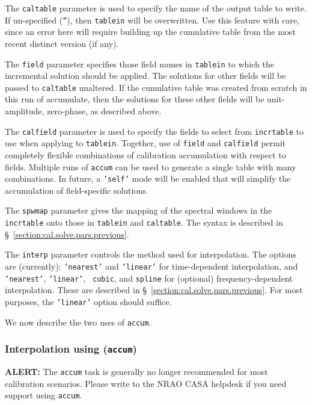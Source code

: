 The {\tt caltable} parameter is used to specify the name of the output
table to write. If un-specified ({\tt ''}), then {\tt tablein} will be
overwritten. Use this feature with care, since an error here will
require building up the cumulative table from the most recent distinct
version (if any).

The {\tt field} parameter specifies those field names in {\tt tablein} to
which the incremental solution should be applied. The solutions for
other fields will be passed to {\tt caltable} unaltered. If the cumulative
table was created from scratch in this run of accumulate, then the
solutions for these other fields will be unit-amplitude, zero-phase,
as described above.

The {\tt calfield} parameter is used to specify the fields to select
from {\tt incrtable} to use when applying to {\tt tablein}. Together,
use of {\tt field} and {\tt calfield} permit completely flexible combinations
of calibration accumulation with respect to fields. Multiple runs of
{\tt accum} can be used to generate a single table with many combinations.
In future, a {\tt 'self'} mode will be enabled that will simplify the
accumulation of field-specific solutions.

The {\tt spwmap} parameter gives the mapping of the spectral windows
in the {\tt incrtable} onto those in {\tt tablein} and {\tt caltable}.
The syntax is described in \S~\ref{section:cal.solve.pars.previous}.

The {\tt interp} parameter controls the method used for interpolation.
The options are (currently): {\tt 'nearest'} and {\tt 'linear'} for
time-dependent interpolation, and {\tt 'nearest'}, {\tt 'linear'}, {\tt
  cubic}, and {\tt spline} for (optional) frequency-dependent interpolation.
These are described in \S~\ref{section:cal.solve.pars.previous}.
For most purposes, the {\tt 'linear'} option should suffice.

We now describe the two uses of {\tt accum}.

\subsubsection{Interpolation using ({\tt accum})}
\label{section:cal.tables.accum.interp}

{\bf ALERT:} The {\tt accum} task is generally no longer recommended
for most calibration scenarios.  Please write to the NRAO CASA
helpdesk  if you need support using {\tt accum}.

